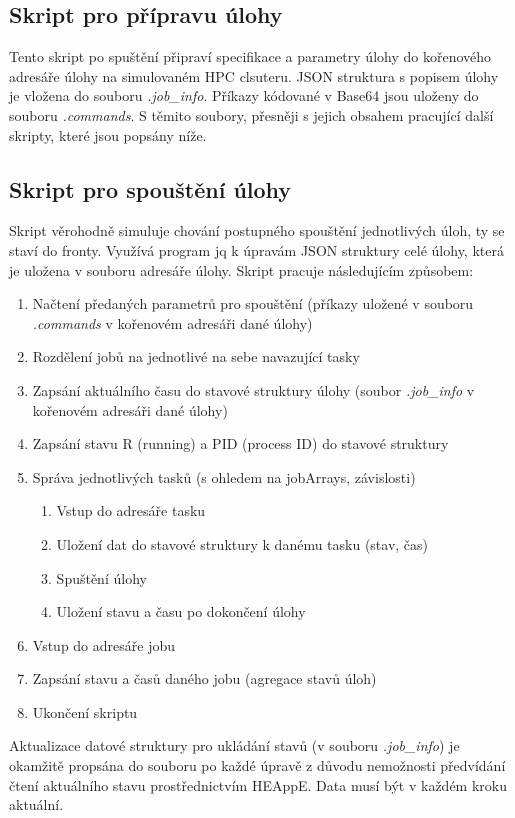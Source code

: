 \subsection{Skript pro přípravu úlohy}
Tento skript po spuštění připraví specifikace a parametry úlohy do kořenového adresáře úlohy na simulovaném HPC clsuteru. JSON struktura s popisem úlohy je vložena do souboru \emph{.job\_info}. Příkazy kódované v Base64 jsou uloženy do souboru \emph{.commands}. S těmito soubory, přesněji s jejich obsahem pracující další skripty, které jsou popsány níže.


\subsection{Skript pro spouštění úlohy}
Skript věrohodně simuluje chování postupného spouštění jednotlivých úloh, ty se staví do fronty. Využívá program jq k úpravám JSON struktury celé úlohy, která je uložena v souboru adresáře úlohy. Skript pracuje následujícím způsobem:

\begin{enumerate}
	\item Načtení předaných parametrů pro spouštění (příkazy uložené v souboru \emph{.commands} v kořenovém adresáři dané úlohy)
	\item Rozdělení jobů na jednotlivé na sebe navazující tasky
	\item Zapsání aktuálního času do stavové struktury úlohy (soubor \emph{.job\_info} v kořenovém adresáři dané úlohy)
	\item Zapsání stavu R (running) a PID (process ID) do stavové struktury
	\item Správa jednotlivých tasků (s ohledem na jobArrays, závislosti)
	\begin{enumerate}
		\item Vstup do adresáře tasku
		\item Uložení dat do stavové struktury k danému tasku (stav, čas)
		\item Spuštění úlohy
		\item Uložení stavu a času po dokončení úlohy
	\end{enumerate}
	\item Vstup do adresáře jobu
	\item Zapsání stavu a časů daného jobu (agregace stavů úloh)
	\item Ukončení skriptu
\end{enumerate}

Aktualizace datové struktury pro ukládání stavů (v souboru \emph{.job\_info}) je okamžitě propsána do souboru po každé úpravě z důvodu nemožnosti předvídání čtení aktuálního stavu prostřednictvím HEAppE. Data musí být v každém kroku aktuální.

